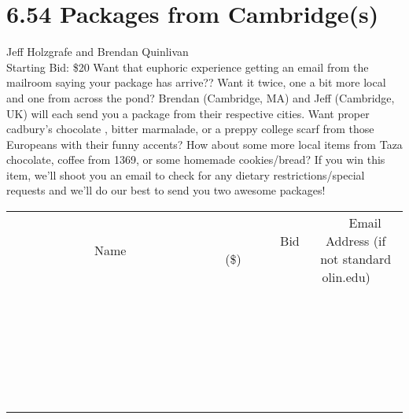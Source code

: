 \documentclass[11pt]{article}
\begin{document}
\section*{6.54 Packages from Cambridge(s)}
Jeff Holzgrafe and Brendan Quinlivan
\\
Starting Bid: \$20
\newline
Want that euphoric experience getting an email from the mailroom saying your package has arrive?? Want it twice, one a bit more local and one from across the pond? Brendan (Cambridge, MA) and Jeff (Cambridge, UK) will each send you a package from their respective cities.  Want proper cadbury's chocolate , bitter marmalade, or a preppy college scarf  from those Europeans with their funny accents?  How about some more local items from Taza chocolate, coffee from 1369, or some homemade cookies/bread? If you win this item, we’ll shoot you an email to check for any dietary restrictions/special requests and we’ll do our best to send you two awesome packages!
\\[6ex]
\begin{tabular}{c c c}
~~~~~~~~~~~~~Name~~~~~~~~~~~~~ & ~~~~~~~~~Bid (\$)~~~~~~~~~  & ~~~Email Address (if not standard olin.edu)~~~\\
 & & \\
\hline
 & & \\
\hline
 & & \\
\hline
 & & \\
\hline
 & & \\
\hline
 & & \\
\hline
 & & \\
\hline
 & & \\
\hline
 & & \\
\hline
 & & \\
\hline
 & & \\
\hline
 & & \\
\hline
 & & \\
\hline
 & & \\
\hline
 & & \\
\hline
 & & \\
\hline
 & & \\
\hline
 & & \\
\hline
 & & \\
\hline
 & & \\
\hline
 & & \\
\hline
 & & \\
\hline
 & & \\
\hline
 & & \\
\hline
 & & \\
\hline
 & & \\
\hline
\end{tabular}
\newpage
\end{document}
